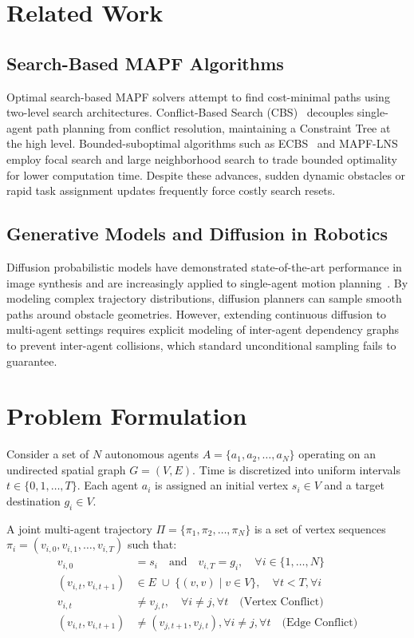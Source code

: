 \documentclass[runningheads]{llncs}
\begin{document}
\section{Related Work}
\subsection{Search-Based MAPF Algorithms}
Optimal search-based MAPF solvers attempt to find cost-minimal paths using two-level search architectures. Conflict-Based Search (CBS)~\cite{sharon2015cbs} decouples single-agent path planning from conflict resolution, maintaining a Constraint Tree at the high level. Bounded-suboptimal algorithms such as ECBS~\cite{barer2014ecbs} and MAPF-LNS~\cite{li2021lns} employ focal search and large neighborhood search to trade bounded optimality for lower computation time. Despite these advances, sudden dynamic obstacles or rapid task assignment updates frequently force costly search resets.

\subsection{Generative Models and Diffusion in Robotics}
Diffusion probabilistic models have demonstrated state-of-the-art performance in image synthesis and are increasingly applied to single-agent motion planning~\cite{janner2022diffuser}. By modeling complex trajectory distributions, diffusion planners can sample smooth paths around obstacle geometries. However, extending continuous diffusion to multi-agent settings requires explicit modeling of inter-agent dependency graphs to prevent inter-agent collisions, which standard unconditional sampling fails to guarantee.

\section{Problem Formulation}
Consider a set of $N$ autonomous agents $A = \{a_1, a_2, \dots, a_N\}$ operating on an undirected spatial graph $G = (V, E)$. Time is discretized into uniform intervals $t \in \{0, 1, \dots, T\}$. Each agent $a_i$ is assigned an initial vertex $s_i \in V$ and a target destination $g_i \in V$.

\begin{definition}
A joint multi-agent trajectory $\Pi = \{\pi_1, \pi_2, \dots, \pi_N\}$ is a set of vertex sequences $\pi_i = (v_{i,0}, v_{i,1}, \dots, v_{i,T})$ such that:
\begin{align}
v_{i,0} &= s_i \quad \text{and} \quad v_{i,T} = g_i, \quad \forall i \in \{1, \dots, N\} \\
(v_{i,t}, v_{i,t+1}) &\in E \;\cup\; \{(v, v) \mid v \in V\}, \quad \forall t < T, \forall i \\
v_{i,t} &\neq v_{j,t}, \quad \forall i \neq j, \forall t \quad \text{(Vertex Conflict)} \\
(v_{i,t}, v_{i,t+1}) &\neq (v_{j,t+1}, v_{j,t}), \forall i \neq j, \forall t \quad \text{(Edge Conflict)}
\end{align}
\end{definition}
\end{document}
